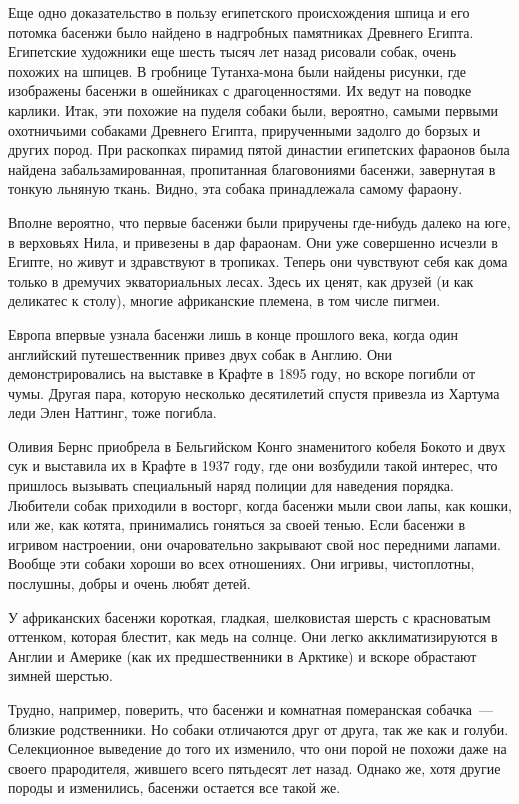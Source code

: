 \documentclass[12pt,a4paper,twoside,openany,svgnames]{memoir}
\begin{document}
Еще одно доказательство в пользу египетского происхождения шпица и его потомка басенжи было найдено в надгробных памятниках Древнего Египта. Египетские художники еще шесть тысяч лет назад рисовали собак, очень похожих на шпицев. В гробнице Тутанха-мона были найдены рисунки, где изображены басенжи в ошейниках с драгоценностями. Их ведут на поводке карлики. Итак, эти похожие на пуделя собаки были, вероятно, самыми первыми охотничьими собаками Древнего Египта, прирученными задолго до борзых и других пород. При раскопках пирамид пятой династии египетских фараонов была найдена забальзамированная, пропитанная благовониями басенжи, завернутая в тонкую льняную ткань. Видно, эта собака принадлежала самому фараону.

Вполне вероятно, что первые басенжи были приручены где-нибудь далеко на юге, в верховьях Нила, и привезены в дар фараонам. Они уже совершенно исчезли в Египте, но живут и здравствуют в тропиках. Теперь они чувствуют себя как дома только в дремучих экваториальных лесах. Здесь их ценят, как друзей (и как деликатес к столу), многие африканские племена, в том числе пигмеи.

Европа впервые узнала басенжи лишь в конце прошлого века, когда один английский путешественник привез двух собак в Англию. Они демонстрировались на выставке в Крафте в 1895 году, но вскоре погибли от чумы. Другая пара, которую несколько десятилетий спустя привезла из Хартума леди Элен Наттинг, тоже погибла.

Оливия Бернс приобрела в Бельгийском Конго знаменитого кобеля Бокото и двух сук и выставила их в Крафте в 1937 году, где они возбудили такой интерес, что пришлось вызывать специальный наряд полиции для наведения порядка. Любители собак приходили в восторг, когда басенжи мыли свои лапы, как кошки, или же, как котята, принимались гоняться за своей тенью. Если басенжи в игривом настроении, они очаровательно закрывают свой нос передними лапами. Вообще эти собаки хороши во всех отношениях. Они игривы, чистоплотны, послушны, добры и очень любят детей.

У африканских басенжи короткая, гладкая, шелковистая шерсть с красноватым оттенком, которая блестит, как медь на солнце. Они легко акклиматизируются в Англии и Америке (как их предшественники в Арктике) и вскоре обрастают зимней шерстью.

Трудно, например, поверить, что басенжи и комнатная померанская собачка~--- близкие родственники. Но собаки отличаются друг от друга, так же как и голуби. Селекционное выведение до того их изменило, что они порой не похожи даже на своего прародителя, жившего всего пятьдесят лет назад. Однако же, хотя другие породы и изменились, басенжи остается все такой же.
\end{document}
